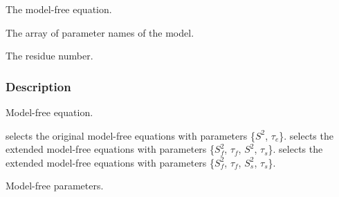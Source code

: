   The model-free equation.

  The array of parameter names of the model.

  The residue number.

\subsubsection{Description}

Model-free equation.

 selects the original model-free equations with parameters \{$S^2$, $\tau_e$\}.
 selects the extended model-free equations with parameters \{$S^2_f$, $\tau_f$, $S^2$, $\tau_s$\}.
 selects the extended model-free equations with parameters \{$S^2_f$, $\tau_f$, $S^2_s$, $\tau_s$\}.


Model-free parameters.


